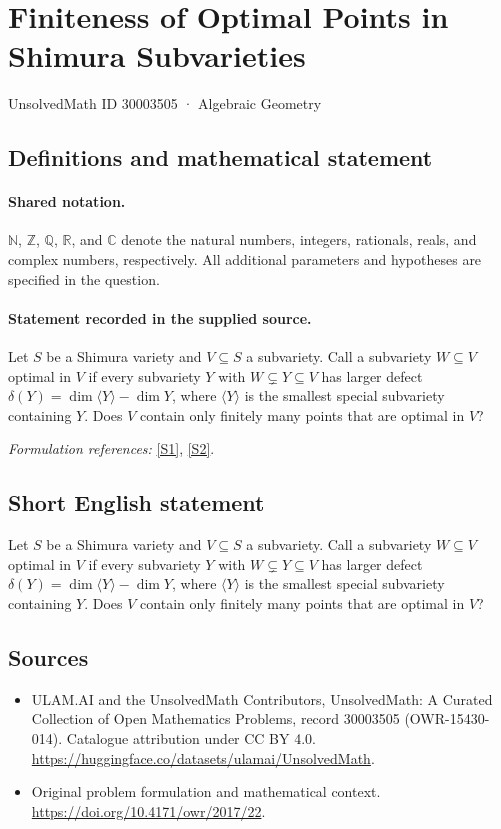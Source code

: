 \documentclass[11pt]{article}
\newcommand{\sref}[2]{\hyperlink{source:#1:#2}{[S#2]}}
\begin{document}
\setcounter{section}{30003504}
\section{Finiteness of Optimal Points in Shimura Subvarieties}\label{30003505}
{\small UnsolvedMath ID 30003505 · Algebraic Geometry}
\subsection{Definitions and mathematical statement}

\paragraph{Shared notation.}$\mathbb N$, $\mathbb Z$, $\mathbb Q$, $\mathbb R$, and $\mathbb C$ denote the natural numbers, integers, rationals, reals, and complex numbers, respectively. All additional parameters and hypotheses are specified in the question.


\paragraph{Statement recorded in the supplied source.}
Let $S$ be a Shimura variety and $V\subseteq S$ a subvariety. Call a subvariety $W\subseteq V$ optimal in $V$ if every subvariety $Y$ with $W\subsetneq Y\subseteq V$ has larger defect $\delta(Y)=\dim\langle Y\rangle-\dim Y$, where $\langle Y\rangle$ is the smallest special subvariety containing $Y$. Does $V$ contain only finitely many points that are optimal in $V$?
\par\smallskip\textit{Formulation references:} \sref{30003505}{1}, \sref{30003505}{2}.
\subsection{Short English statement}
Let $S$ be a Shimura variety and $V\subseteq S$ a subvariety. Call a subvariety $W\subseteq V$ optimal in $V$ if every subvariety $Y$ with $W\subsetneq Y\subseteq V$ has larger defect $\delta(Y)=\dim\langle Y\rangle-\dim Y$, where $\langle Y\rangle$ is the smallest special subvariety containing $Y$. Does $V$ contain only finitely many points that are optimal in $V$?
\subsection{Sources}
\begin{itemize}
\item[\hypertarget{source:30003505:1}{S1}] ULAM.AI and the UnsolvedMath Contributors, UnsolvedMath: A Curated Collection of Open Mathematics Problems, record 30003505 (OWR-15430-014). Catalogue attribution under CC BY 4.0.
\url{https://huggingface.co/datasets/ulamai/UnsolvedMath}.
\item[\hypertarget{source:30003505:2}{S2}] Original problem formulation and mathematical context.
\url{https://doi.org/10.4171/owr/2017/22}.
\end{itemize}
\label{end:30003505}
\end{document}
